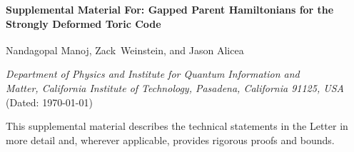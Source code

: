 \makeatletter 
    
\renewcommand\onecolumngrid{%
\do@columngrid{one}{\@ne}%
\def\set@footnotewidth{\onecolumngrid}%
\def\footnoterule{\kern-6pt\hrule width 1.5in\kern6pt}%
}

\renewcommand\twocolumngrid{%
        \def\footnoterule{%
        \dimen@\skip\footins\divide\dimen@\thr@@
        \kern-\dimen@\hrule width.5in\kern\dimen@}
        \do@columngrid{mlt}{\tw@}
}%


\makeatother

\onecolumngrid
\newpage

\renewcommand{\thefigure}{S\arabic{figure}}
\renewcommand{\theequation}{S\arabic{equation}}
\renewcommand{\thetable}{S\Roman{table}}
\renewcommand{\thesection}{S\Roman{section}}

\setcounter{secnumdepth}{2}
\setcounter{equation}{0}
\setcounter{section}{0}
\setcounter{figure}{0}
\setcounter{table}{0}
\setcounter{page}{1}

\renewcommand*{\thefootnote}{\fnsymbol{footnote}}
\setcounter{footnote}{0}
\setcounter{footnote}{0}
\renewcommand*{\thefootnote}{\arabic{footnote}}
\begin{center}
\textbf{\large Supplemental Material For:
Gapped Parent Hamiltonians for the Strongly Deformed Toric Code}

\vspace{5mm}
Nandagopal Manoj,\textsuperscript{\hyperlink{equalcontrib}{\textasteriskcentered}} Zack~Weinstein, and Jason Alicea


\textit{\small Department of Physics and Institute for Quantum Information and  \\
\vspace{-0.5mm}
Matter, California Institute of Technology, Pasadena, California 91125, USA} \\
\vspace{-0.5mm}
{\small (Dated: \today)}
\end{center}

\thispagestyle{empty}

\noindent This supplemental material describes the technical statements in the Letter in more detail and, wherever applicable, provides rigorous proofs and bounds. 


